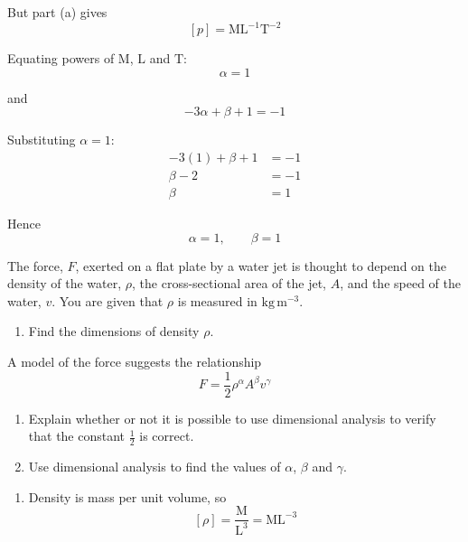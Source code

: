 \documentclass[leqno]{article}
\begin{document}
\begin{enumerate}[
  label=\textbf{\arabic*.},
  leftmargin=*,
  topsep=0pt,
  partopsep=0pt,
  parsep=0pt
]
\begin{djsSolution}
\begin{enumerate}[label=\textbf{(\alph*)}, start=1]
  But part (a) gives
  \[
  [p] = \mathrm{ML^{-1}T^{-2}}
  \]

  Equating powers of \(\mathrm{M}\), \(\mathrm{L}\) and \(\mathrm{T}\):
  \[
  \alpha = 1
  \]

  and
  \[
  -3\alpha + \beta + 1 = -1
  \]

  Substituting \(\alpha=1\):
  \begin{align*}
  -3(1) + \beta + 1 &= -1 \\
  \beta - 2 &= -1 \\
  \beta &= 1
  \end{align*}

  Hence
  \[
  \alpha = 1, \qquad \beta = 1
  \]
\end{enumerate}
\end{djsSolution}


\newpage

\questionitem

The force, $F$, exerted on a flat plate by a water jet is thought to depend on the density of the water, $\rho$, the cross-sectional area of the jet, $A$, and the speed of the water, $v$. You are given that $\rho$ is measured in $\mathrm{kg\,m^{-3}}$. \\
\begin{enumerate}[label=\textbf{(\alph*)}]
  \item Find the dimensions of density $\rho$.  \\
\end{enumerate}
A model of the force suggests the relationship
\[
F = \frac12 \rho^\alpha A^\beta v^\gamma
\]
\begin{enumerate}[label=\textbf{(\alph*)}, resume]
  \item Explain whether or not it is possible to use dimensional analysis to verify that the constant $\frac12$ is correct.  \\
  \item Use dimensional analysis to find the values of $\alpha$, $\beta$ and $\gamma$.  \\
\end{enumerate}

\vspace*{10pt}

\begin{djsSolution}
\begin{enumerate}[label=\textbf{(\alph*)}, start=1]
  \item Density is mass per unit volume, so
\[
[\rho]=\frac{\mathrm{M}}{\mathrm{L^3}}=\mathrm{ML^{-3}}
\]



\end{enumerate}
\end{djsSolution}
\end{enumerate}
\end{document}
